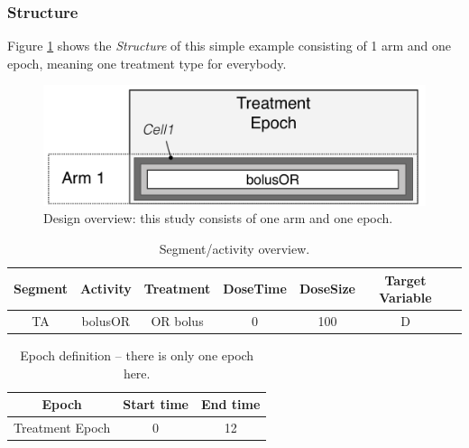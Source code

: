 \subsubsection{Structure}

Figure \ref{fig:designPatternBonate} shows the \textit{Structure} of
this simple example consisting of 1 arm and one epoch, meaning one treatment
type for everybody.

\begin{figure}[ht!]
\centering
\includegraphics[width=0.7\linewidth]{pics/OneArmOneEpoch}
\caption{Design overview: this study consists of one arm and one epoch.}
\label{fig:designPatternBonate}
\end{figure}

\begin{table}[htdp!]
\begin{center}
\renewcommand{\arraystretch}{1.1}%
\begin{tabular}{ccccccc}
\hline
Segment&Activity & Treatment & DoseTime & DoseSize & Target Variable \\
\hline
TA& bolusOR &  OR bolus & 0 & 100 & D \\
\hline
\end{tabular}
\end{center}
\caption{Segment/activity overview.}
\label{tab:segementActivity_Ribba}
\end{table}

\begin{table}[htdp!]
\begin{center}
\renewcommand{\arraystretch}{1.1}%
\begin{tabular}{ccc}
\hline
Epoch & Start time & End time \\
\hline
Treatment Epoch & 0 &  12  \\
\hline
\end{tabular}
\end{center}
\caption{Epoch definition -- there is only one epoch here.}
\label{fig:Bonate:epochDef}
\end{table}

